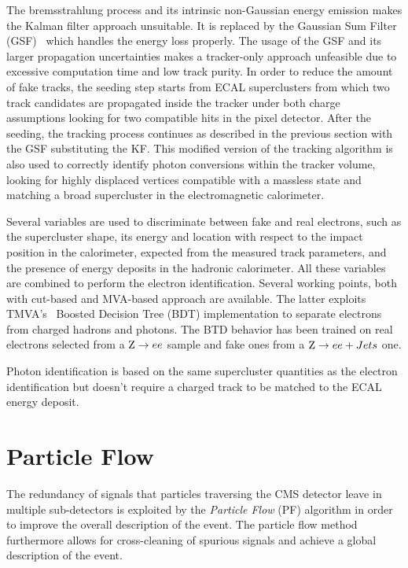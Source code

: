 The bremsstrahlung process and its intrinsic non-Gaussian energy emission makes the Kalman filter approach unsuitable. It is replaced by the Gaussian Sum Filter (GSF)~\cite{gsf} which handles the energy loss properly. The usage of the GSF and its larger propagation uncertainties makes a tracker-only approach unfeasible due to excessive computation time and low track purity. In order to reduce the amount of fake tracks, the seeding step starts from ECAL superclusters from which two track candidates are propagated inside the tracker under both charge assumptions looking for two compatible hits in the pixel detector. After the seeding, the tracking process continues as described in the previous section with the GSF substituting the KF. This modified version of the tracking algorithm is also used to correctly identify photon conversions within the tracker volume, looking for highly displaced vertices compatible with a massless state and matching a broad supercluster in the electromagnetic calorimeter.

Several variables are used to discriminate between fake and real electrons, such as the supercluster shape, its energy and location with respect to the impact position in the calorimeter, expected from the measured track parameters, and the presence of energy deposits in the hadronic calorimeter. All these variables are combined to perform the electron identification. Several working points, both with cut-based and MVA-based approach are available. The latter exploits TMVA's~\cite{TMVA} Boosted Decision Tree (BDT) implementation to separate electrons from charged hadrons and photons. The BTD behavior has been trained on real electrons selected from a $\mathrm{Z} \rightarrow ee$ sample and fake ones from a $\mathrm{Z} \rightarrow ee + Jets$ one.

Photon identification is based on the same supercluster quantities as the electron identification but doesn't require a charged track to be matched to the ECAL energy deposit.  

\section{Particle Flow}

The redundancy of signals that particles traversing the CMS detector leave in multiple sub-detectors is exploited by the \emph{Particle Flow} (PF) algorithm in order to improve the overall description of the event. The particle flow method furthermore allows for cross-cleaning of spurious signals and achieve a global description of the event.

